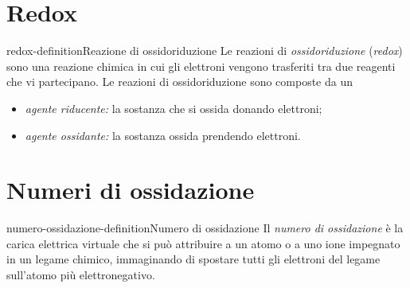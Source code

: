 \documentclass[preview]{standalone}
\begin{document}
\genpage

\section{Redox}

\begin{snippetdefinition}{redox-definition}{Reazione di ossidoriduzione}
    Le reazioni di \textit{ossidoriduzione} (\textit{redox}) sono una reazione chimica in cui gli elettroni
    vengono trasferiti tra due reagenti che vi partecipano.
    Le reazioni di ossidoriduzione sono composte da un
    \begin{itemize}
        \item \textit{agente riducente:} la sostanza che si ossida donando elettroni;
        \item \textit{agente ossidante:} la sostanza ossida prendendo elettroni.
    \end{itemize}
\end{snippetdefinition}


\section{Numeri di ossidazione}

\begin{snippetdefinition}{numero-ossidazione-definition}{Numero di ossidazione}
    Il \textit{numero di ossidazione} è la carica elettrica virtuale che si può
    attribuire a un atomo o a uno ione impegnato in un legame chimico,
    immaginando di spostare tutti gli elettroni del legame sull'atomo più elettronegativo.
\end{snippetdefinition}
\end{document}
